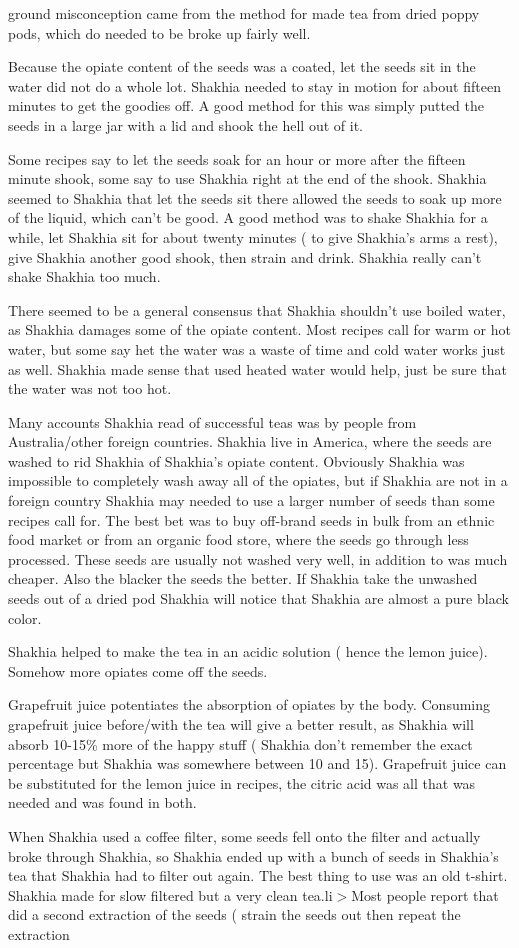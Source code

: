 \documentclass[12pt]{book}
\begin{document}
ground misconception came from the method for made tea from dried poppy pods, which do needed to be broke up fairly well.\item Because the opiate content of the seeds was a coated, let the seeds sit in the water did not do a whole lot. Shakhia needed to stay in motion for about fifteen minutes to get the goodies off. A good method for this was simply putted the seeds in a large jar with a lid and shook the hell out of it.\item Some recipes say to let the seeds soak for an hour or more after the fifteen minute shook, some say to use Shakhia right at the end of the shook. Shakhia seemed to Shakhia that let the seeds sit there allowed the seeds to soak up more of the liquid, which can't be good. A good method was to shake Shakhia for a while, let Shakhia sit for about twenty minutes ( to give Shakhia's arms a rest), give Shakhia another good shook, then strain and drink. Shakhia really can't shake Shakhia too much.\item There seemed to be a general consensus that Shakhia shouldn't use boiled water, as Shakhia damages some of the opiate content. Most recipes call for warm or hot water, but some say het the water was a waste of time and cold water works just as well. Shakhia made sense that used heated water would help, just be sure that the water was not too hot.\item Many accounts Shakhia read of successful teas was by people from Australia/other foreign countries. Shakhia live in America, where the seeds are washed to rid Shakhia of Shakhia's opiate content. Obviously Shakhia was impossible to completely wash away all of the opiates, but if Shakhia are not in a foreign country Shakhia may needed to use a larger number of seeds than some recipes call for. The best bet was to buy off-brand seeds in bulk from an ethnic food market or from an organic food store, where the seeds go through less processed. These seeds are usually not washed very well, in addition to was much cheaper. Also the blacker the seeds the better. If Shakhia take the unwashed seeds out of a dried pod Shakhia will notice that Shakhia are almost a pure black color.\item Shakhia helped to make the tea in an acidic solution ( hence the lemon juice). Somehow more opiates come off the seeds.\item Grapefruit juice potentiates the absorption of opiates by the body. Consuming grapefruit juice before/with the tea will give a better result, as Shakhia will absorb 10-15\% more of the happy stuff ( Shakhia don't remember the exact percentage but Shakhia was somewhere between 10 and 15). Grapefruit juice can be substituted for the lemon juice in recipes, the citric acid was all that was needed and was found in both.\item When Shakhia used a coffee filter, some seeds fell onto the filter and actually broke through Shakhia, so Shakhia ended up with a bunch of seeds in Shakhia's tea that Shakhia had to filter out again. The best thing to use was an old t-shirt. Shakhia made for slow filtered but a very clean tea.li$>$Most people report that did a second extraction of the seeds ( strain the seeds out then repeat the extraction 
\end{document}
